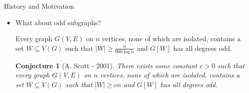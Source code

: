 \documentclass{beamer}
\theoremstyle{plain}
\newtheorem{conjecture}[theorem]{Conjecture}
\begin{document}
	\begin{frame}{History and Motivation}
		\begin{itemize}
			\item What about odd subgraphs?\pause

			\begin{theorem}[A. Scott - 1992]
				Every graph $G(V, E)$ on $n$ vertices, none of which are isolated, contains a set $W\subseteq V(G)$ such that $|W|\geq \frac{n}{900 \log n}$ and $G[W]$ has all degrees odd.
			\end{theorem}\pause

			\begin{conjecture}[A. Scott - 2001]
				There exists some constant $c>0$ such that every graph $G(V, E)$ on $n$ vertices, none of which are isolated, contains a set $W\subseteq V(G)$ such that $|W|\geq cn$ and $G[W]$ has all degrees odd.
			\end{conjecture}

		\end{itemize}
	\end{frame}
\end{document}
